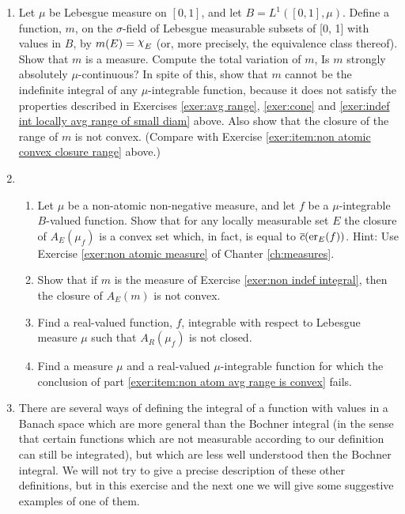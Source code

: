 \begin{enumerate}[label=\arabic*),ref=\arabic*]
\item\label{exer:non indef integral}
Let $\mu$ be Lebesgue measure on $[0,1]$, and let $B=L^1([0,1],\mu)$. Define a function, $m$, on the $\sigma$-field of Lebesgue measurable subsets of [0, 1] with values in $B$, by $m(E)=\idf{E}$ (or, more precisely, the equivalence class thereof). Show that $m$ is a measure. Compute the total variation of $m$, Is $m$ strongly absolutely $\mu$-continuous? In spite of this, show that $m$ cannot be the indefinite integral of any $\mu$-integrable function, because it does not satisfy the properties described in Exercises \ref{exer:avg range}, \ref{exer:cone} and \ref{exer:indef int locally avg range of small diam} above. Also show that the closure of the range of $m$ is not convex. (Compare with Exercise \ref{exer:item:non atomic convex closure range} above.)

\item
\begin{enumerate}[label=\alph*),ref=\theenumi\alph*)]
    \item\label{exer:item:non atom avg range is convex}
    Let $\mu$ be a non-atomic non-negative measure, and let $f$ be a $\mu$-integrable $B$-valued function. Show that for any locally measurable set $E$ the closure of $A_E(\mu_f)$ is a convex set which, in fact, is equal to $\overline{c}(\er{f}{E})$. Hint: Use Exercise \ref{exer:non atomic measure} of Chanter \ref{ch:measures}.
    
    \item Show that if $m$ is the measure of Exercise \ref{exer:non indef integral}, then the closure of $A_E(m)$ is not convex.

    \item Find a real-valued function, $f$, integrable with respect to Lebesgue measure $\mu$ such that $A_R(\mu_f)$ is not closed.

    \item Find a measure $\mu$ and a real-valued $\mu$-integrable function for which the conclusion of part \ref{exer:item:non atom avg range is convex} fails.
\end{enumerate}

\item\label{exer:other def of bochner}
There are several ways of defining the integral of a function with values in a Banach space which are more general than the Bochner integral (in the sense that certain functions which are not measurable according to our definition can still be integrated), but which are less well understood then the Bochner integral. We will not try to give a precise description of these other definitions, but in this exercise and the next one we will give some suggestive examples of one of them. %


\end{enumerate}
